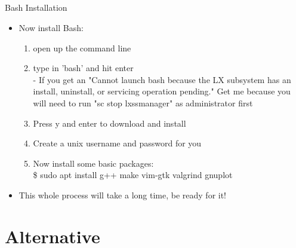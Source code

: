 \documentclass{beamer}
\begin{document}
\subsection{}

\begin{frame}{Bash Installation}
\begin{itemize}
\item Now install Bash:
\begin{enumerate}
\item open up the command line
\item type in 'bash' and hit enter\\
    - If you get an "Cannot launch bash because the LX subsystem has an install, uninstall, or servicing operation pending." Get me because you will need to run "sc stop lxssmanager" as administrator first
\item Press y and enter to download and install
\item Create a unix username and password for you
\item Now install some basic packages: \\
\$ sudo apt install g++ make vim-gtk valgrind gnuplot
\end{enumerate}
\item This whole process will take a long time, be ready for it!
\end{itemize}
\end{frame}

\section{Alternative}
\subsection{}
\end{document}

